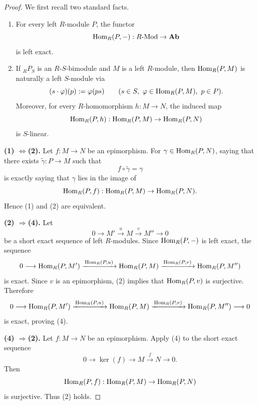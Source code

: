 \begin{proof}
    We first recall two standard facts.

    \begin{enumerate}
        \item For every left $R$-module $P$, the functor
              \[
                  \mathrm{Hom}_R(P,-): R\text{-}\mathrm{Mod}\to \mathbf{Ab}
              \]
              is left exact.

        \item If ${}_R P_S$ is an $R$-$S$-bimodule and $M$ is a left $R$-module, then $\mathrm{Hom}_R(P,M)$ is naturally a left $S$-module via
              \[
                  (s\cdot \varphi)(p):=\varphi(ps)
                  \qquad
                  (s\in S,\ \varphi\in \mathrm{Hom}_R(P,M),\ p\in P).
              \]
              Moreover, for every $R$-homomorphism $h:M\to N$, the induced map
              \[
                  \mathrm{Hom}_R(P,h):\mathrm{Hom}_R(P,M)\to \mathrm{Hom}_R(P,N)
              \]
              is $S$-linear.
    \end{enumerate}

    \medskip
    \noindent\textbf{(1) $\Longleftrightarrow$(2).}
    Let $f:M\to N$ be an epimorphism. For $\gamma\in \mathrm{Hom}_R(P,N)$, saying that there
    exists $\widetilde{\gamma}:P\to M$ such that
    \[
        f\circ \widetilde{\gamma}=\gamma
    \]
    is exactly saying that $\gamma$ lies in the image of
    \[
        \mathrm{Hom}_R(P,f):\mathrm{Hom}_R(P,M)\to \mathrm{Hom}_R(P,N).
    \]
    Hence (1) and (2) are equivalent.

    \medskip
    \noindent\textbf{(2) $\Longrightarrow$(4).}
    Let
    \[
        0\longrightarrow M' \xrightarrow{\,u\,} M \xrightarrow{\,v\,} M'' \longrightarrow 0
    \]
    be a short exact sequence of left $R$-modules. Since $\mathrm{Hom}_R(P,-)$ is left exact, the
    sequence
    \[
        0\longrightarrow \mathrm{Hom}_R(P,M')
        \xrightarrow{\,\mathrm{Hom}_R(P,u)\,}
        \mathrm{Hom}_R(P,M)
        \xrightarrow{\,\mathrm{Hom}_R(P,v)\,}
        \mathrm{Hom}_R(P,M'')
    \]
    is exact. Since $v$ is an epimorphism, (2) implies that $\mathrm{Hom}_R(P,v)$ is surjective.
    Therefore
    \[
        0\longrightarrow \mathrm{Hom}_R(P,M')
        \xrightarrow{\,\mathrm{Hom}_R(P,u)\,}
        \mathrm{Hom}_R(P,M)
        \xrightarrow{\,\mathrm{Hom}_R(P,v)\,}
        \mathrm{Hom}_R(P,M'')
        \longrightarrow 0
    \]
    is exact, proving (4).

    \medskip
    \noindent\textbf{(4) $\Longrightarrow$(2).}
    Let $f:M\to N$ be an epimorphism. Apply (4) to the short exact sequence
    \[
        0\longrightarrow \ker(f)\longrightarrow M\xrightarrow{\,f\,}N\longrightarrow 0.
    \]
    Then
    \[
        \mathrm{Hom}_R(P,f):\mathrm{Hom}_R(P,M)\to \mathrm{Hom}_R(P,N)
    \]
    is surjective. Thus (2) holds.


\end{proof}
